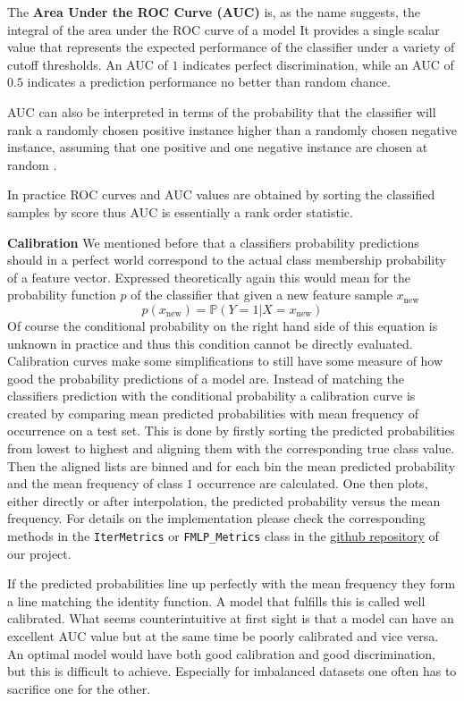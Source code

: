 The \textbf{Area Under the ROC Curve (AUC)} is, as the name suggests, the integral of the area under the ROC curve of a model
It provides a single scalar value that represents the expected performance of the classifier under a variety of cutoff thresholds.
An AUC of $1$ indicates perfect discrimination, while an AUC of $0.5$ indicates a prediction performance no better than random chance.

AUC can also be interpreted in terms of the probability that the classifier will rank a randomly chosen positive instance higher than a randomly chosen negative instance,
assuming that one positive and one negative instance are chosen at random \cite{hanley1982meaning}.

In practice ROC curves and AUC values are obtained by sorting the classified samples by score thus AUC is essentially a rank order statistic.

\textbf{Calibration}
We mentioned before that a classifiers probability predictions should in a perfect world correspond to the actual class membership probability of a feature vector.
Expressed theoretically again this would mean for the probability function $p$ of the classifier that given a new feature sample $x_\text{new}$
\[
	p(x_\text{new}) = \mathbb{P}(Y = 1 | X = x_\text{new})
\]
Of course the conditional probability on the right hand side of this equation is unknown in practice and thus this condition cannot be directly evaluated.
Calibration curves make some simplifications to still have some measure of how good the probability predictions of a model are.
Instead of matching the classifiers prediction with the conditional probability a calibration curve is created by comparing mean predicted probabilities 
with mean frequency of occurrence on a test set.
This is done by firstly sorting the predicted probabilities from lowest to highest and aligning them with the corresponding true class value.
Then the aligned lists are binned and for each bin the mean predicted probability and the mean frequency of class $1$ occurrence are calculated.
One then plots, either directly or after interpolation, the predicted probability versus the mean frequency.
For details on the implementation please check the corresponding methods in the \texttt{IterMetrics} or \texttt{FMLP\_Metrics} class 
in the \href{https://github.com/gnthr-solve/TP_ML_Pipeline}{github repository} of our project.

If the predicted probabilities line up perfectly with the mean frequency they form a line matching the identity function.
A model that fulfills this is called well calibrated.
What seems counterintuitive at first sight is that a model can have an excellent AUC value but at the same time be poorly calibrated and vice versa.
An optimal model would have both good calibration and good discrimination, but this is difficult to achieve.
Especially for imbalanced datasets one often has to sacrifice one for the other.

